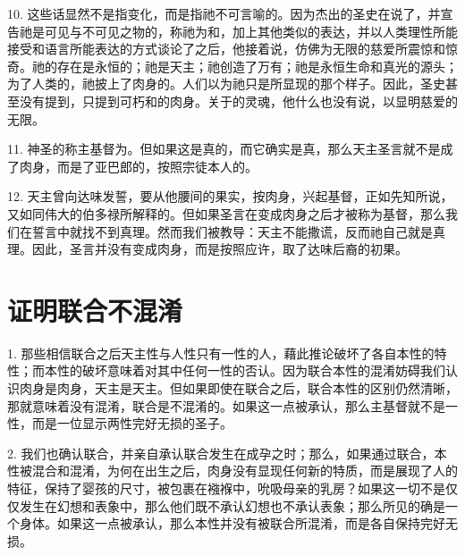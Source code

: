 10. 这些话显然不是指变化，而是指祂不可言喻的。因为杰出的圣史在说了，并宣告祂是可见与不可见之物的，称祂为和，加上其他类似的表达，并以人类理性所能接受和语言所能表达的方式谈论了之后，他接着说，仿佛为无限的慈爱所震惊和惊奇。祂的存在是永恒的；祂是天主；祂创造了万有；祂是永恒生命和真光的源头；为了人类的，祂披上了肉身的。人们以为祂只是所显现的那个样子。因此，圣史甚至没有提到，只提到可朽和的肉身。关于的灵魂，他什么也没有说，以显明慈爱的无限。\par

11. 神圣的称主基督为。但如果这是真的，而它确实是真，那么天主圣言就不是成了肉身，而是了亚巴郎的，按照宗徒本人的。\par

12. 天主曾向达味发誓，要从他腰间的果实，按肉身，兴起基督，正如先知所说，又如同伟大的伯多禄所解释的。但如果圣言在变成肉身之后才被称为基督，那么我们在誓言中就找不到真理。然而我们被教导：天主不能撒谎，反而祂自己就是真理。因此，圣言并没有变成肉身，而是按照应许，取了达味后裔的初果。\par


\section{证明联合不混淆}

1. 那些相信联合之后天主性与人性只有一性的人，藉此推论破坏了各自本性的特性；而本性的破坏意味着对其中任何一性的否认。因为联合本性的混淆妨碍我们认识肉身是肉身，天主是天主。但如果即使在联合之后，联合本性的区别仍然清晰，那就意味着没有混淆，联合是不混淆的。如果这一点被承认，那么主基督就不是一性，而是一位显示两性完好无损的圣子。\par

2. 我们也确认联合，并亲自承认联合发生在成孕之时；那么，如果通过联合，本性被混合和混淆，为何在出生之后，肉身没有显现任何新的特质，而是展现了人的特征，保持了婴孩的尺寸，被包裹在襁褓中，吮吸母亲的乳房？如果这一切不是仅仅发生在幻想和表象中，那么他们既不承认幻想也不承认表象；那么所见的确是一个身体。如果这一点被承认，那么本性并没有被联合所混淆，而是各自保持完好无损。\par

